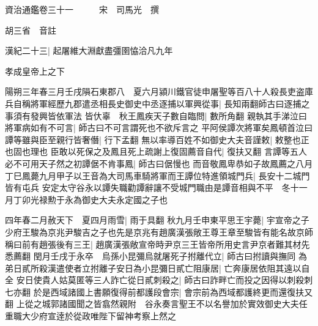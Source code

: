 






























































資治通鑑卷三十一　　　宋　司馬光　撰

胡三省　音註

漢紀二十三|{
	起屠維大淵獻盡彊圉恊洽凡九年}


孝成皇帝上之下

陽朔三年春三月壬戌隕石東郡八　夏六月潁川鐵官徒申屠聖等百八十人殺長吏盗庫兵自稱將軍經歷九郡遣丞相長史御史中丞逐捕以軍興從事|{
	長知兩翻師古曰逐捕之事須有發興皆依軍法}
皆㐲辜　秋王鳳疾天子數自臨問|{
	數所角翻}
親執其手涕泣曰將軍病如有不可言|{
	師古曰不可言謂死也不欲斥言之}
平阿侯譚次將軍矣鳳頓首泣曰譚等雖與臣至親行皆奢僭|{
	行下孟翻}
無以率導百姓不如御史大夫音謹敕|{
	敕整也正也固也理也}
臣敢以死保之及鳳且死上疏謝上復固薦音自代|{
	復扶又翻}
言譚等五人必不可用天子然之初譚倨不肯事鳳|{
	師古曰倨慢也}
而音敬鳳卑恭如子故鳳薦之八月丁巳鳳薨九月甲子以王音為大司馬車騎將軍而王譚位特進領城門兵|{
	長安十二城門皆有屯兵}
安定太守谷永以譚失職勸譚辭讓不受城門職由是譚音相與不平　冬十一月丁卯光禄勲于永為御史大夫永定國之子也

四年春二月赦天下　夏四月雨雪|{
	雨于具翻}
秋九月壬申東平思王宇薨|{
	宇宣帝之子}
少府王駿為京兆尹駿吉之子也先是京兆有趙廣漢張敞王尊王章至駿皆有能名故京師稱曰前有趙張後有三王|{
	趙廣漢張敞宣帝時尹京三王皆帝所用史言尹京者難其材先悉薦翻}
閏月壬戌于永卒　烏孫小昆彌烏就屠死子拊離代立|{
	師古曰拊讀與撫同}
為弟日貳所殺漢遣使者立拊離子安日為小昆彌日貳亡阻康居|{
	亡奔康居依阻其遠以自全}
安日使貴人姑莫匿等三人詐亡從日貳刺殺之|{
	師古曰詐畔亡而投之因得以刺殺刺七亦翻}
於是西域諸國上書願復得前都護段會宗|{
	會宗前為西域都護終更而還復扶又翻}
上從之城郭諸國聞之皆翕然親附　谷永奏言聖王不以名譽加於實效御史大夫任重職大少府宣逹於從政唯陛下留神考察上然之

